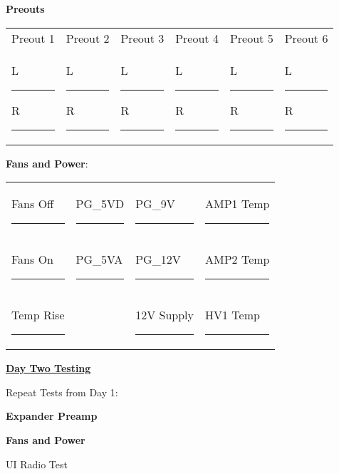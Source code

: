 \documentclass{article}
\begin{document}
\begin{checklist}
  \item \textbf{Preouts}
\end{checklist}
{\renewcommand{\arraystretch}{1.5} %
\hspace{2em}\begin{tabularx}{48em}{XXXXXX}
  Preout 1 & Preout 2 & Preout 3 & Preout 4 & Preout 5 & Preout 6 \\
  L \rule{2em}{0.4pt} R \rule{2em}{0.4pt} &
  L \rule{2em}{0.4pt} R \rule{2em}{0.4pt} &
  L \rule{2em}{0.4pt} R \rule{2em}{0.4pt} &
  L \rule{2em}{0.4pt} R \rule{2em}{0.4pt} &
  L \rule{2em}{0.4pt} R \rule{2em}{0.4pt} &
  L \rule{2em}{0.4pt} R \rule{2em}{0.4pt} \\
\end{tabularx}}

\begin{checklist}
  \item \textbf{Fans and Power}:
\end{checklist}
{\renewcommand{\arraystretch}{1.5} %
\hspace{2em}\begin{tabularx}{40em}{XXXX}
  Fans Off  \hfill\rule{3em}{0.4pt} & PG\_5VD \hfill\rule{3em}{0.4pt} & PG\_9V     \hfill\rule{3em}{0.4pt} & AMP1 Temp \hfill\rule{3em}{0.4pt} \\
  Fans On   \hfill\rule{3em}{0.4pt} & PG\_5VA \hfill\rule{3em}{0.4pt} & PG\_12V    \hfill\rule{3em}{0.4pt} & AMP2 Temp \hfill\rule{3em}{0.4pt} \\
  Temp Rise \hfill\rule{3em}{0.4pt} &                                 & 12V Supply \hfill\rule{3em}{0.4pt} & HV1 Temp  \hfill\rule{3em}{0.4pt} \\
\end{tabularx}}

\bigskip
\textbf{\underline{Day Two Testing}}
\begin{checklist}
\item Repeat Tests from Day 1:
\begin{checklist}
  \item \textbf{Expander Preamp}
  \item \textbf{Fans and Power}
\end{checklist}
\item UI Radio Test
\end{checklist}
\end{document}
